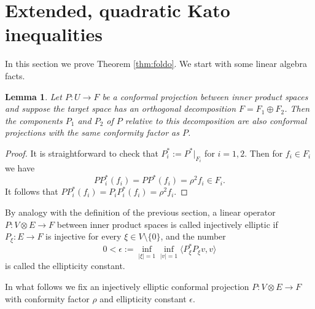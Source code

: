\documentclass[12pt]{amsart} %
\newtheorem{lemma}[theorem]{Lemma}
\theoremstyle{definition}
\numberwithin{equation}{section}
\newcommand{\ra}{\rightarrow}
\begin{document}
\section{Extended, quadratic Kato inequalities} \label{sect3}

In this section we prove Theorem \ref{thm:foldo}. We start with some linear algebra facts.

\begin{lemma}\label{alglemm1} Let $P:U \ra F$ be a conformal projection between inner product spaces and suppose the target space has an orthogonal decomposition $F=F_1\oplus F_2$. Then the components $P_1$ and $P_2$ of $P$ relative to this decomposition are also conformal projections with the same conformity factor as $P$.
\end{lemma}

\begin{proof} It is straightforward to check that $P_i^ *:=P^ *\bigr|_{F_i}$ for $i=1,2$. Then for $f_i\in F_i$ we have
\[PP_i^ *(f_i)=PP^*(f_i)=\rho^ 2f_i\in F_i.\]
It follows that $PP_i^ *(f_i)=P_iP_i^ *(f_i)=\rho^2 f_i$.
\end{proof}

By analogy with the definition of the previous section, a linear operator $P:V\otimes E\ra F$ between inner product spaces is called injectively elliptic if $P_{\xi}:E\ra F$ is injective for every $\xi \in V\setminus \{0\}$, and the number
\[0<\epsilon:=\inf_{|\xi|=1}\inf_{|v|=1}\langle P_{\xi}^*P_{\xi}v,v\rangle\]
is called the ellipticity constant. 

In what follows we fix  an injectively elliptic conformal projection $P:V\otimes E\ra F$ with conformity factor $\rho$ and ellipticity constant $\epsilon$.
\end{document}

